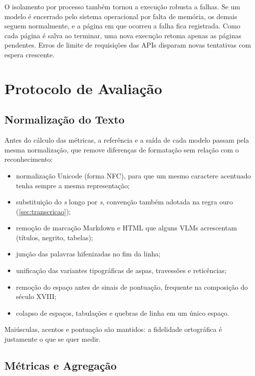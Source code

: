 \documentclass[noabntexcite,oneside]{ufsc-thesis-rn46-2019}
\begin{document}
O isolamento por processo também tornou a execução robusta a falhas. Se um modelo é
encerrado pelo sistema operacional por falta de memória, os demais seguem normalmente, e a
página em que ocorreu a falha fica registrada. Como cada página é salva ao terminar, uma
nova execução retoma apenas as páginas pendentes. Erros de limite de requisições das APIs
disparam novas tentativas com espera crescente.

\section{Protocolo de Avaliação}
\label{sec:protocolo_avaliacao}

\subsection{Normalização do Texto}

Antes do cálculo das métricas, a referência e a saída de cada modelo passam pela mesma
normalização, que remove diferenças de formatação sem relação com o reconhecimento:

\begin{itemize}
    \item normalização Unicode (forma NFC), para que um mesmo caractere acentuado tenha
    sempre a mesma representação;
    \item substituição do \textit{s} longo por \textit{s}, convenção também
    adotada na regra ouro (\autoref{sec:transcricao});
    \item remoção de marcação Markdown e HTML que alguns VLMs acrescentam (títulos,
    negrito, tabelas);
    \item junção das palavras hifenizadas no fim da linha;
    \item unificação das variantes tipográficas de aspas, travessões e reticências;
    \item remoção do espaço antes de sinais de pontuação, frequente na composição do
    século XVIII;
    \item colapso de espaços, tabulações e quebras de linha em um único espaço.
\end{itemize}

Maiúsculas, acentos e pontuação são mantidos: a fidelidade ortográfica é justamente o que
se quer medir.

\subsection{Métricas e Agregação}
\end{document}
